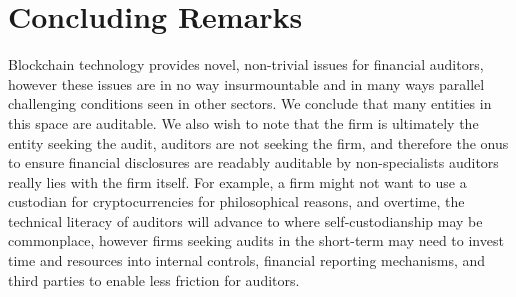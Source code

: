 \section{Concluding Remarks}

Blockchain technology provides novel, non-trivial issues for financial auditors, however these issues are in no way insurmountable and in many ways parallel challenging conditions seen in other sectors. We conclude that many entities in this space are auditable. We also wish to note that the firm is ultimately the entity seeking the audit, auditors are not seeking the firm, and therefore the onus to ensure financial disclosures are readably auditable by non-specialists auditors really lies with the firm itself. For example, a firm might not want to use a custodian for cryptocurrencies for philosophical reasons, and overtime, the technical literacy of auditors will advance to where self-custodianship may be commonplace, however firms seeking audits in the short-term may need to invest time and resources into internal controls, financial reporting mechanisms, and third parties to enable less friction for auditors. 


